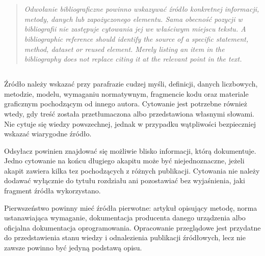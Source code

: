 \chapter{}
\label{app:cytowania}

\begin{quote}\itshape
  \ploren
  {Odwołanie bibliograficzne powinno wskazywać źródło konkretnej informacji, metody, danych lub zapożyczonego elementu. Sama obecność pozycji w bibliografii nie zastępuje cytowania jej we właściwym miejscu tekstu.}
  {A bibliographic reference should identify the source of a specific statement, method, dataset or reused element. Merely listing an item in the bibliography does not replace citing it at the relevant point in the text.}
\end{quote}

\section{}

Źródło należy wskazać przy parafrazie cudzej myśli, definicji, danych liczbowych, metodzie, modelu, wymaganiu normatywnym, fragmencie kodu oraz materiale graficznym pochodzącym od innego autora. Cytowanie jest potrzebne również wtedy, gdy treść została przetłumaczona albo przedstawiona własnymi słowami. Nie cytuje się wiedzy powszechnej, jednak w przypadku wątpliwości bezpieczniej wskazać wiarygodne źródło.

Odsyłacz powinien znajdować się możliwie blisko informacji, którą dokumentuje. Jedno cytowanie na końcu długiego akapitu może być niejednoznaczne, jeżeli akapit zawiera kilka tez pochodzących z różnych publikacji. Cytowania nie należy dodawać wyłącznie do tytułu rozdziału ani pozostawiać bez wyjaśnienia, jaki fragment źródła wykorzystano.

Pierwszeństwo powinny mieć źródła pierwotne: artykuł opisujący metodę, norma ustanawiająca wymaganie, dokumentacja producenta danego urządzenia albo oficjalna dokumentacja oprogramowania. Opracowanie przeglądowe jest przydatne do przedstawienia stanu wiedzy i odnalezienia publikacji źródłowych, lecz nie zawsze powinno być jedyną podstawą opisu.

\section{}


